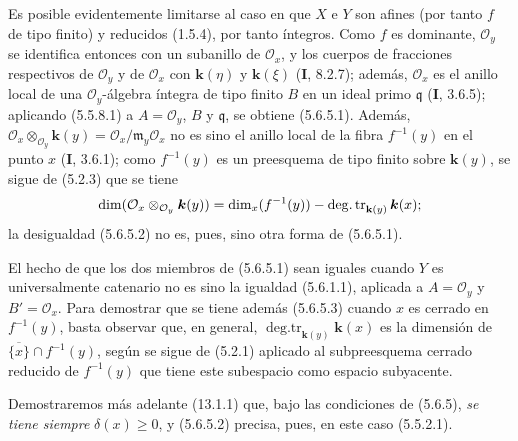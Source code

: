 Es posible evidentemente limitarse al caso en que $X$ e $Y$ son afines (por
tanto $f$ de tipo finito) y reducidos (1.5.4), por tanto íntegros. Como $f$ es
dominante, $\mathcal O_y$ se identifica entonces con un subanillo de
$\mathcal O_x$, y los cuerpos de fracciones respectivos de $\mathcal O_y$ y
de $\mathcal O_x$ con $\boldsymbol{k}(\eta)$ y $\boldsymbol{k}(\xi)$ (\textbf I, 8.2.7); además,
$\mathcal O_x$ es el anillo local de una $\mathcal O_y$-álgebra íntegra de
tipo finito $B$ en un ideal primo $\mathfrak q$ (\textbf I, 3.6.5);
aplicando
(5.5.8.1) a $A=\mathcal O_y$, $B$ y $\mathfrak q$, se obtiene (5.6.5.1).
Además,
$\mathcal O_x\otimes_{\mathcal O_y}\boldsymbol{k}(y)=\mathcal O_x/\mathfrak m_y\mathcal O_x$
no es sino el anillo local de la fibra $f^{-1}(y)$ en el punto $x$
(\textbf I, 3.6.1); como $f^{-1}(y)$ es un preesquema de tipo finito sobre $\boldsymbol{k}(y)$, se
sigue de (5.2.3) que se tiene
\[
\dim(\mathcal O_x\otimes_{\mathcal O_y}\boldsymbol{k}(y))
=\dim_x(f^{-1}(y))-\operatorname{deg.tr}_{\mathbf{k}(y)}\boldsymbol{k}(x);
\]
la desigualdad (5.6.5.2) no es, pues, sino otra forma de (5.6.5.1).

El hecho de que los dos miembros de (5.6.5.1) sean iguales cuando $Y$ es
universalmente
catenario no es sino la igualdad (5.6.1.1), aplicada a
$A=\mathcal O_y$ y $B'=\mathcal O_x$. Para demostrar que se tiene además
(5.6.5.3) cuando $x$ es cerrado en $f^{-1}(y)$, basta observar que, en
general, $\operatorname{deg.tr}_{\mathbf{k}(y)}\boldsymbol{k}(x)$ es la dimensión de
$\overline{\{x\}}\cap f^{-1}(y)$, según se sigue de (5.2.1) aplicado al
subpreesquema cerrado reducido de $f^{-1}(y)$ que tiene este subespacio como
espacio subyacente.

Demostraremos más adelante (13.1.1) que, bajo las condiciones de (5.6.5), \emph{se
tiene siempre} $\delta(x)\geq0$, y (5.6.5.2) precisa, pues, en este caso (5.5.2.1).
